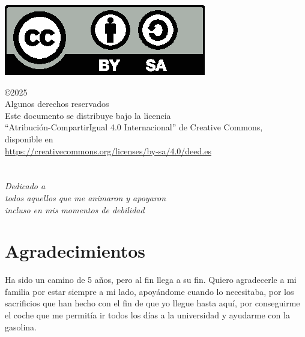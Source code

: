 \documentclass[a4paper, 12pt]{book}
\makeatletter
\let\theauthor\@author
\makeatother
\begin{document}
\begin{flushright}
	\includegraphics[scale=0.6]{img/by-sa}

	\noindent©2025 \theauthor  \\
	Algunos derechos reservados  \\
	Este documento se distribuye bajo la licencia \\
	``Atribución-CompartirIgual 4.0 Internacional'' de Creative Commons, \\
	disponible en \\
	\url{https://creativecommons.org/licenses/by-sa/4.0/deed.es}
\end{flushright}


\chapter*{}
\begin{flushright}
	\textit{Dedicado a \\
		todos aquellos que me animaron y apoyaron \\
		incluso en mis momentos de debilidad}
\end{flushright}


\chapter*{Agradecimientos}
Ha sido un camino de 5 años, pero al fin llega a su fin. Quiero agradecerle a mi familia por estar siempre a mi lado, apoyándome cuando lo necesitaba, por los sacrificios que han hecho con el fin de que yo llegue hasta aquí, por conseguirme el coche que me permitía ir todos los días a la universidad y ayudarme con la gasolina. 
\end{document}
